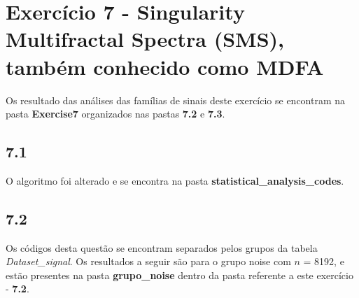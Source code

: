 
\section*{\large Exercício 7 - Singularity Multifractal Spectra (SMS), também conhecido como MDFA}
%

Os resultado das análises das famílias de sinais deste exercício se encontram na pasta \textbf{Exercise7} organizados nas pastas \textbf{7.2} e \textbf{7.3}.

\subsection*{7.1}
%

O algoritmo foi alterado e se encontra na pasta \textbf{statistical\_analysis\_codes}.

\subsection*{7.2}
%

Os códigos desta questão se encontram separados pelos grupos da tabela \textit{Dataset\_signal}. Os resultados a seguir são para o grupo noise com $n$ = 8192, e estão presentes na pasta \textbf{grupo\_noise} dentro da pasta referente a este exercício - \textbf{7.2}.

